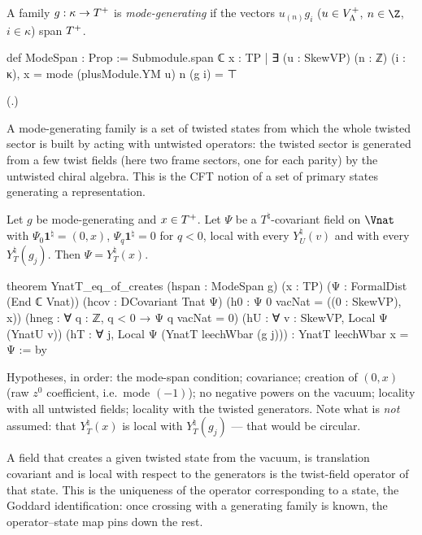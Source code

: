 \begin{definition}\label{ch10:def:modespan}
A family $g:\kappa\to T^{+}$ is \emph{mode-generating} if the vectors $u_{(n)}g_i$
($u\in V_{\Lambda}^{+}$, $n\in\Z$, $i\in\kappa$) span $T^{+}$.
\end{definition}
\begin{leancode}
def ModeSpan : Prop :=
  Submodule.span ℂ {x : TP | ∃ (u : SkewVP) (n : ℤ) (i : κ), x = mode (plusModule.YM u) n (g i)} = ⊤
\end{leancode}
(.)

\begin{physics}
A mode-generating family is a set of twisted states from which the whole twisted sector is built by acting with untwisted operators: the twisted sector is generated from a few twist fields (here two frame sectors, one for each parity) by the untwisted chiral algebra. This is the CFT notion of a set of primary states generating a representation.
\end{physics}

\begin{theorem}\label{ch10:thm:creates}
Let $g$ be mode-generating and $x\in T^{+}$.  Let $\Psi$ be a $T^\natural$-covariant field on
$\Vnat$ with $\Psi_0\mathbf1^\natural=(0,x)$, $\Psi_q\mathbf1^\natural=0$ for $q<0$, local with every
$Y^\natural_U(v)$ and with every $Y^\natural_T(g_j)$.  Then $\Psi=Y^\natural_T(x)$.
\end{theorem}
\begin{leancode}
theorem YnatT_eq_of_creates (hspan : ModeSpan g) (x : TP) (Ψ : FormalDist (End ℂ Vnat))
    (hcov : DCovariant Tnat Ψ) (h0 : Ψ 0 vacNat = ((0 : SkewVP), x))
    (hneg : ∀ q : ℤ, q < 0 → Ψ q vacNat = 0) (hU : ∀ v : SkewVP, Local Ψ (YnatU v))
    (hT : ∀ j, Local Ψ (YnatT leechWbar (g j))) : YnatT leechWbar x = Ψ := by
\end{leancode}
\begin{dictionary}
Hypotheses, in order: the mode-span condition; covariance; creation of $(0,x)$ (raw $z^0$
coefficient, i.e.\ mode $(-1)$); no negative powers on the vacuum; locality with all untwisted
fields; locality with the twisted generators.  Note what is \emph{not} assumed: that
$Y^\natural_T(x)$ is local with $Y^\natural_T(g_j)$ --- that would be circular.
\end{dictionary}

\begin{physics}
A field that creates a given twisted state from the vacuum, is translation covariant and is local with respect to the generators is the twist-field operator of that state. This is the uniqueness of the operator corresponding to a state, the Goddard identification: once crossing with a generating family is known, the operator--state map pins down the rest.
\end{physics}

